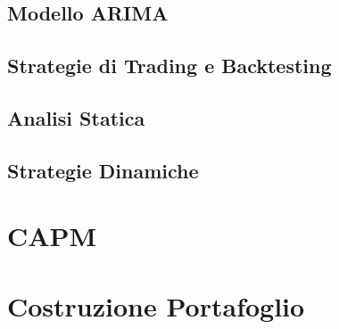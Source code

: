 \documentclass[11pt, a4paper]{report} %
\begin{document}
\section{Modello ARIMA}

\section{Strategie di Trading e Backtesting}

\section{Analisi Statica}

\section{Strategie Dinamiche}

\chapter{CAPM}

\chapter{Costruzione Portafoglio}
\end{document}
